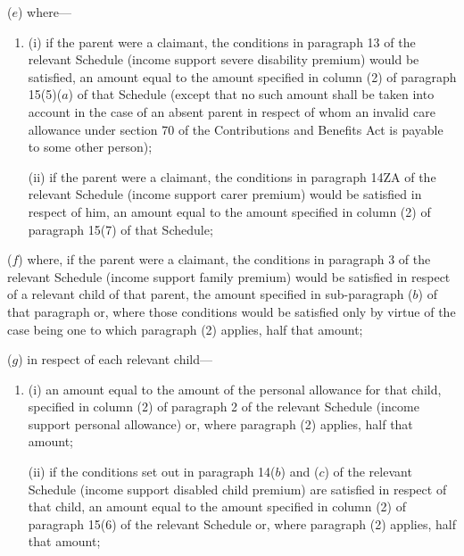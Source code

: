 \documentclass[12pt,a4paper]{article}
\begin{document}
\begin{enumerate}
($e$) where—
\begin{enumerate}\item[]
(i) if the parent were a claimant, the conditions in paragraph 13 of the relevant Schedule (income support severe disability premium) would be satisfied, an amount equal to the amount specified in column (2) of paragraph 15(5)($a$) of that Schedule (except that no such amount shall be taken into account in the case of an absent parent in respect of whom an invalid care allowance under section 70 of the Contributions and Benefits Act is payable to some other person);

(ii) if the parent were a claimant, the conditions in paragraph 14ZA of the relevant Schedule (income support carer premium) would be satisfied in respect of him, an amount equal to the amount specified in column (2) of paragraph 15(7) of that Schedule;
\end{enumerate}

($f$) where, if the parent were a claimant, the conditions in paragraph 3 of the relevant Schedule (income support family premium) would be satisfied in respect of a relevant child of that parent, 
the amount specified in 
sub-paragraph ($b$) of  %
that paragraph or, where those conditions would be satisfied only by virtue of the case being one to which paragraph (2) applies, half that amount;

($g$) in respect of each relevant child—
\begin{enumerate}\item[]
(i) an amount equal to the amount of the personal allowance for that child, specified in column (2) of paragraph 2 of the relevant Schedule (income support personal allowance) or, where paragraph (2) applies, half that amount;

(ii) if the conditions set out in paragraph 14($b$) and ($c$) of the relevant Schedule (income support disabled child premium) are satisfied in respect of that child, an amount equal to the amount specified in column (2) of paragraph 15(6) of the relevant Schedule or, where paragraph (2) applies, half that amount;
\end{enumerate}


\end{enumerate}
\end{document}
